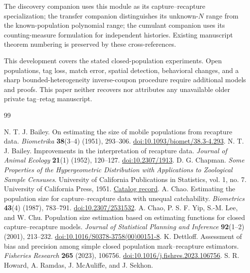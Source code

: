 \documentclass[11pt]{article}
\theoremstyle{remark}\newtheorem{remark}[theorem]{Remark}
\begin{document}
The discovery companion uses this module as its capture--recapture
specialization; the transfer companion distinguishes its unknown-$N$ range
from the known-population polynomial range; the cumulant companion uses
its counting-measure formulation for independent histories. Existing
manuscript theorem numbering is preserved by these cross-references.

This development covers the stated closed-population experiments. Open
populations, tag loss, match error, spatial detection, behavioral changes,
and a sharp bounded-heterogeneity inverse-coupon procedure require additional
models and proofs. This paper neither recovers nor attributes any unavailable
older private tag--retag manuscript.

\begingroup\small
\begin{thebibliography}{99}\raggedright
\setlength{\itemsep}{3pt}\setlength{\parskip}{0pt}
 N. T. J. Bailey.
On estimating the size of mobile populations from recapture data.
\emph{Biometrika} \textbf{38}(3--4) (1951), 293--306.
\href{https://doi.org/10.1093/biomet/38.3-4.293}{doi:10.1093/biomet/38.3-4.293}.
 N. T. J. Bailey.
Improvements in the interpretation of recapture data.
\emph{Journal of Animal Ecology} \textbf{21}(1) (1952), 120--127.
\href{https://doi.org/10.2307/1913}{doi:10.2307/1913}.
 D. G. Chapman.
\emph{Some Properties of the Hypergeometric Distribution with Applications
to Zoological Sample Censuses}. University of California Publications in
Statistics, vol. 1, no. 7. University of California Press, 1951.
\href{https://catalog.hathitrust.org/Record/005761134}{Catalog record}.
 A. Chao.
Estimating the population size for capture--recapture data with unequal catchability.
\emph{Biometrics} \textbf{43}(4) (1987), 783--791.
\href{https://doi.org/10.2307/2531532}{doi:10.2307/2531532}.
 A. Chao, P. S. F. Yip, S.-M. Lee, and W. Chu.
Population size estimation based on estimating functions for closed
capture--recapture models. \emph{Journal of Statistical Planning and Inference}
\textbf{92}(1--2) (2001), 213--232.
\href{https://doi.org/10.1016/S0378-3758(00)00151-8}{doi:10.1016/S0378-3758(00)00151-8}.
 K. Dettloff.
Assessment of bias and precision among simple closed population mark--recapture
estimators. \emph{Fisheries Research} \textbf{265} (2023), 106756.
\href{https://doi.org/10.1016/j.fishres.2023.106756}{doi:10.1016/j.fishres.2023.106756}.
 S. R. Howard, A. Ramdas, J. McAuliffe, and J. Sekhon.

\end{thebibliography}
\end{document}
